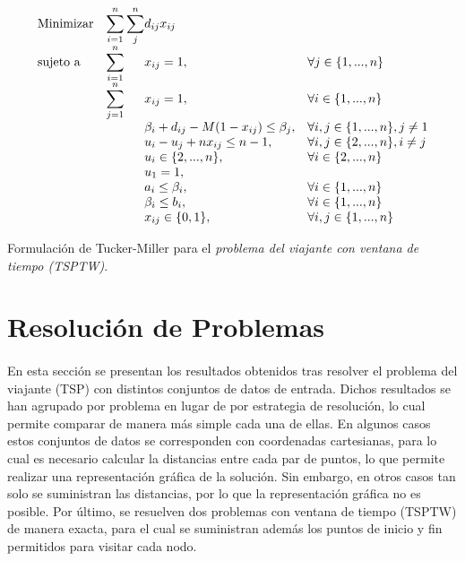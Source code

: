 \documentclass[spanish]{article}
\begin{document}
		\begin{eqfloat}
			\begin{equation}
				\begin{array}{ll@{}ll}
					\text{Minimizar}	& \displaystyle\sum\limits_{i = 1}^{n}\sum\limits_{j}^{n} & d_{ij}x_{ij} &\\
					\text{sujeto a}		& \displaystyle\sum\limits_{i = 1}^{n}	&	x_{ij} 	= 1,  & \forall j \in \{1,...,n\} \\
														& \displaystyle\sum\limits_{j = 1}^{n}	&	x_{ij} 	= 1,  & \forall i \in \{1,...,n\} \\
														& 				&	\beta_{i} + d_{ij} - M(1-x_{ij}) \leq \beta_{j},  & \forall i, j \in \{1,...,n\}, j \neq 1 \\
														& 				&	u_i - u_j + n x_{ij}	\leq n-1,  & \forall i, j \in \{2,...,n\}, i \neq j \\
														&                               &	u_{i} \in \{2,...,n\}, 		& \forall i \in \{2,...,n\} \\
														&                               &	u_{1}  = 1, 	& \\
														&                               &	a_{i} \leq \beta_{i}, 		& \forall i \in \{1,...,n\} \\
														&                               &	\beta_{i} \leq b_{i}, 		& \forall i \in \{1,...,n\} \\
														&                               &	x_{ij} \in \{0,1\}, 	& \forall i,j \in \{1,...,n\}
				\end{array}
			\end{equation}
			\caption{Formulación de Tucker-Miller para el \emph{problema del viajante con ventana de tiempo (TSPTW)}.}
			\label{eq:tsp_tm}
		\end{eqfloat}

	\section{Resolución de Problemas}

		\paragraph{}
		En esta sección se presentan los resultados obtenidos tras resolver el problema del viajante (TSP) con distintos conjuntos de datos de entrada. Dichos resultados se han agrupado por problema en lugar de por estrategia de resolución, lo cual permite comparar de manera más simple cada una de ellas. En algunos casos estos conjuntos de datos se corresponden con coordenadas cartesianas, para lo cual es necesario calcular la distancias entre cada par de puntos, lo que permite realizar una representación gráfica de la solución. Sin embargo, en otros casos tan solo se suministran las distancias, por lo que la representación gráfica no es posible. Por último, se resuelven dos problemas con ventana de tiempo (TSPTW) de manera exacta, para el cual se suministran además los puntos de inicio y fin permitidos para visitar cada nodo.
\end{document}
